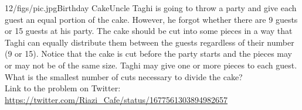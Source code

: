 \begin{problem}{12/figs/pic.jpg}{Birthday Cake}Uncle Taghi is going to throw a party and give each guest an equal portion of the cake. However, he forgot whether there are 9 guests or 15 guests at his party. The cake should be cut into some pieces in a way that Taghi can equally distribute them between the guests regardless of their number (9 or 15). Notice that the cake is cut before the party starts and the pieces may or may not be of the same size. Taghi may give one or more pieces to each guest. What is the smallest number of cuts necessary to divide the cake?\\[0.2cm]

Link to the problem on Twitter:  \url{https://twitter.com/Riazi_Cafe/status/1677561303894982657}\end{problem}